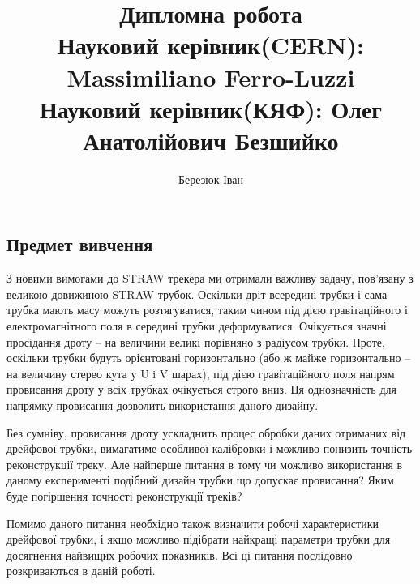 \documentclass[pdftex,14pt]{scrartcl}
\author{Березюк Іван}
\title{ Дипломна робота \\
		Науковий керівник(CERN): Massimiliano Ferro-Luzzi\\
		Науковий керівник(КЯФ): Олег Анатолійович Безшийко \\
		}
\begin{document}

	
	
	\pagestyle{empty}
		
	\newpage
	
%	
	\tableofcontents	 
	\newpage
	
	\pagestyle{plain}
  
	\begin{spacing}{1.5} 
	 
	

 \section{Предмет вивчення} 
	
	З новими вимогами до STRAW трекера ми отримали важливу задачу, пов’язану з великою довижиною STRAW трубок. Оскільки дріт всередині трубки і сама трубка мають масу можуть розтягуватися, таким чином під дією гравітаційного і електромагнітного поля в середині трубки деформуватися. Очікується значні просідання дроту -- на величини великі порівняно з радіусом трубки. Проте, оскільки трубки будуть орієнтовані горизонтально (або ж майже горизонтально -- на величину стерео кута у U i V шарах), під дією гравітаційного поля напрям провисання дроту у всіх трубках очікується строго вниз. Ця однозначність для напрямку провисання дозволить використання даного дизайну. 


	Без сумніву, провисання дроту ускладнить процес обробки даних отриманих від дрейфової трубки, вимагатиме особливої калібровки  і можливо понизить точність реконструкції треку. Але найперше питання в тому чи можливо використання в даному експерименті подібний дизайн трубки що допускає провисання? Яким буде погіршення точності реконструкції треків?
	
	Помимо даного питання необхідно також визначити робочі характеристики дрейфової трубки, і якщо можливо підібрати найкращі параметри трубки для досягнення найвищих робочих показників. Всі ці питання послідовно розкриваються в даній роботі.
	

\end{spacing}
\end{document}

